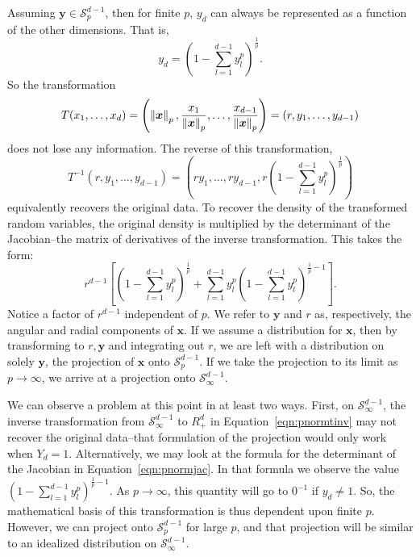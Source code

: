 Assuming $\bm{y} \in \mathcal{S}_{p}^{d-1}$, then for finite $p$, $y_d$ can always be represented
  as a function of the other dimensions.  That is,
  \begin{equation*}
    y_d = \left(1 - {\textstyle\sum}_{l = 1}^{d-1}y_l^p\right)^{\frac{1}{p}}.
  \end{equation*}
  So the transformation
  \begin{equation}
    \label{eqn:pnormt}
    T(x_1,\ldots,x_d) = \left(\left\lVert \bm{x} \right\rVert_{p}, \frac{x_1}{\left\lVert \bm{x} \right\rVert_{p}},
                          \ldots , \frac{x_{d-1}}{\left\lVert \bm{x} \right\rVert_{p}}\right) = (r,y_1,\ldots,y_{d-1})
  \end{equation}
  does not lose any information.  The reverse of this transformation,
  \begin{equation}
    \label{eqn:pnormtinv}
    T^{-1}\left(r,y_1,\ldots,y_{d-1}\right) =
      \left(ry_1,\ldots,ry_{d-1}, r\left(1 - {\textstyle\sum}_{l = 1}^{d-1}y_l^p\right)^{\frac{1}{p}}\right)
  \end{equation}
  equivalently recovers the original data.  To recover the density of the transformed random variables,
  the original density is multiplied by the determinant of the Jacobian--the matrix of derivatives
  of the inverse transformation.  This takes the form:
  \begin{equation}
    \label{eqn:pnormjac}
    r^{d-1}\left[\left(1 - {\textstyle\sum}_{l = 1}^{d-1}y_l^p\right)^{\frac{1}{p}} +
        {\textstyle\sum}_{l = 1}^{d-1}y_l^p\left(1 - {\textstyle\sum}_{l=1}^{d-1} y_l^p\right)^{\frac{1}{p} - 1}\right].
  \end{equation}
  Notice a factor of $r^{d-1}$ independent of $p$. We refer to $\bm{y}$ and $r$ as, respectively,
  the angular and radial components of $\bm{x}$.  If we assume a distribution for $\bm{x}$, then
  by transforming to $r, \bm{y}$ and integrating out $r$, we are left with a distribution on solely
  $\bm{y}$, the projection of $\bm{x}$ onto $\mathcal{S}_{p}^{d-1}$.  If we take the projection to
  its limit as $p\to\infty$, we arrive at a projection onto $\mathcal{S}_{\infty}^{d-1}$.
  
We can observe a problem at this point in at least two ways.  First, on $\mathcal{S}_{\infty}^{d-1}$, the
  inverse transformation from $\mathcal{S}_{\infty}^{d-1}$ to $R_+^{d}$ in Equation~\ref{eqn:pnormtinv} 
  may not recover the original data--that formulation of the projection would only work when $Y_d = 1$.
  Alternatively, we may look at the formula for the determinant of the Jacobian in
  Equation~\ref{eqn:pnormjac}.  In that formula we observe the value 
  $(1 - \sum_{l = 1}^{d-1}y_l^p)^{\frac{1}{p} - 1}$.  As $p\to\infty$, 
  this quantity will go to $0^{-1}$ if $y_d \neq 1$.
  So, the mathematical basis of this transformation is thus dependent upon finite $p$.  However, we can
  project onto $\mathcal{S}_p^{d-1}$ for large $p$, and that projection will be similar to an idealized 
  distribution on $\mathcal{S}_{\infty}^{d-1}$.

